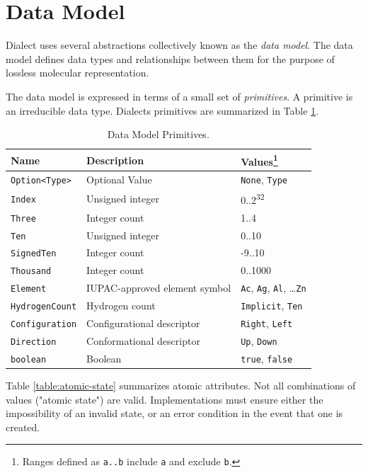 \documentclass{article}
\def\ttt{\texttt}
\begin{document}
\section*{Data Model}

Dialect uses several abstractions collectively known as the \textit{data model}. The data model defines data types and relationships between them for the purpose of lossless molecular representation.

The data model is expressed in terms of a small set of \textit{primitives}. A primitive is an irreducible data type. Dialects primitives are summarized in Table \ref{table:primitives}.

\begin{table}
\begin{minipage}{\textwidth}
\renewcommand*\footnoterule{}
\caption{Data Model Primitives.}
\label{table:primitives}
\centering
\begin{tabular}{l l l}
    \hline
    Name & Description & Values\footnote{Ranges defined as \ttt{a..b} include \ttt{a} and exclude \ttt{b}.} \\
    \hline
    \ttt{Option<Type>} & Optional Value & \ttt{None}, \ttt{Type} \\
    \ttt{Index} & Unsigned integer & 0..2\textsuperscript{32} \\
    \ttt{Three} & Integer count & 1..4 \\
    \ttt{Ten} & Unsigned integer & 0..10 \\
    \ttt{SignedTen} & Integer count & -9..10 \\
    \ttt{Thousand} & Integer count & 0..1000 \\
    \ttt{Element} & IUPAC-\-approved element symbol & \ttt{Ac}, \ttt{Ag}, \ttt{Al}, {\ldots}\ttt{Zn}\\
    \ttt{HydrogenCount} & Hydrogen count & \ttt{Implicit}, \ttt{Ten} \\
    \ttt{Configuration} & Configurational descriptor & \ttt{Right}, \ttt{Left} \\
    \ttt{Direction} & Conformational descriptor & \ttt{Up}, \ttt{Down} \\
    \ttt{boolean} & Boolean & \ttt{true}, \ttt{false} \\
    \hline
\end{tabular}
\end{minipage}
\end{table}

Table \ref{table:atomic-state} summarizes atomic attributes. Not all combinations of values ("atomic state") are valid. Implementations must ensure either the impossibility of an invalid state, or an error condition in the event that one is created.
\end{document}
